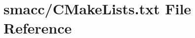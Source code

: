 \hypertarget{smacc_2CMakeLists_8txt}{}\section{smacc/\+C\+Make\+Lists.txt File Reference}
\label{smacc_2CMakeLists_8txt}
